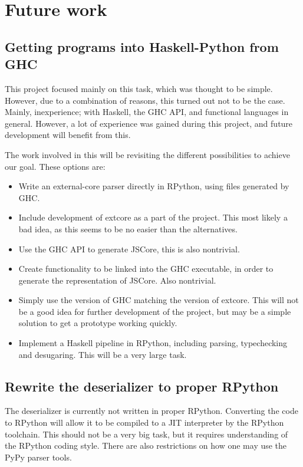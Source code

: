 \section{Future work}

\subsection{Getting programs into Haskell-Python from GHC}

This project focused mainly on this task, which was thought to be simple.
However, due to a combination of reasons, this turned out not to be the case.
Mainly, inexperience; with Haskell, the GHC API, and functional languages in 
general. However, a lot of experience was gained during this project, and
future development will benefit from this.

The work involved in this will be revisiting the different possibilities to
achieve our goal. These options are:

\begin{itemize}
\item Write an external-core parser directly in RPython, using files generated by GHC.
\item Include development of extcore as a part of the project. This most likely a bad
idea, as this seems to be no easier than the alternatives.
\item Use the GHC API to generate JSCore, this is also nontrivial.
\item Create functionality to be linked into the GHC executable, in order to generate the
representation of JSCore. Also nontrivial.
\item Simply use the version of GHC matching the version of extcore. This will not be
a good idea for further development of the project, but may be a simple solution to get
a prototype working quickly.
\item Implement a Haskell pipeline in RPython, including parsing, typechecking and desugaring.
This will be a very large task.
\end{itemize}

\subsection{Rewrite the deserializer to proper RPython}

The deserializer is currently not written in proper RPython. 
Converting the code to RPython will allow it to be compiled to a JIT interpreter by
the RPython toolchain. This should not be a very big task, but it requires understanding
of the RPython coding style. There are also restrictions on how one may use the PyPy parser
tools.

